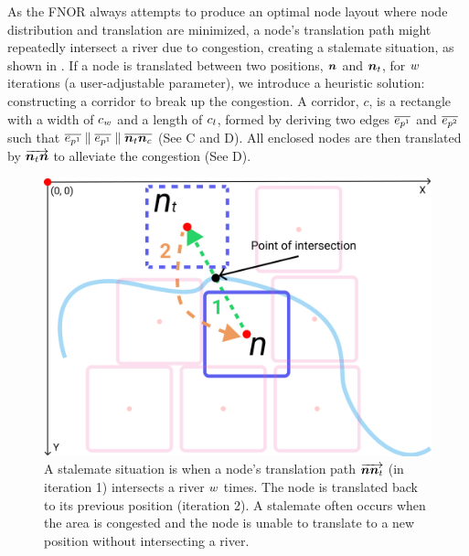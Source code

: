 As the FNOR always attempts to produce an optimal node layout where node distribution and translation are minimized, a node's translation path might repeatedly intersect a river due to congestion, creating a stalemate situation, as shown in . If a node is translated between two positions, $ \bm{n} $ and $ \bm{n}_t $, for $ w $ iterations (a user-adjustable parameter), we introduce a heuristic solution: constructing a corridor to break up the congestion. A corridor, $ c $, is a rectangle with a width of $ c_w $ and a length of $ c_l $, formed by deriving two edges $ \protect\overline{e_{p^1}} $ and $ \protect\overline{e_{p^2}} $ such that $ \protect\overline{e_{p^1}} \parallel \protect\overline{e_{p^1}} \parallel \protect\overline{\bm{n}_t\bm{n}_c} $ (See C and D). All enclosed nodes are then translated by $ \protect\overrightarrow{\bm{n}_t\bm{n}} $ to alleviate the congestion (See D).

{
\begin{figure}[tb!]
    \centering
    \includegraphics[width=\columnwidth]{figure/stalemate.png}
    \caption{A stalemate situation is when a node's translation path $ \protect\overrightarrow{\bm{n}\bm{n}_t} $ (in iteration 1) intersects a river $ w $ times. The node is translated back to its previous position (iteration 2). A stalemate often occurs when the area is congested and the node is unable to translate to a new position without intersecting a river.}
    \label{fig:stalemate}
\end{figure}
}

